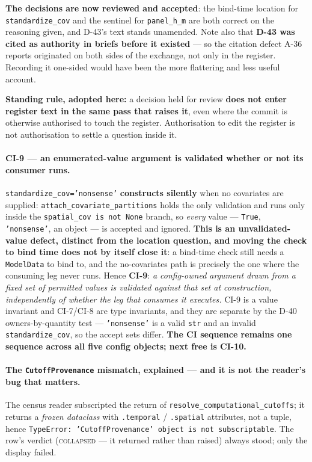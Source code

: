 \documentclass[
  10pt,
]{article}
\begin{document}
\textbf{The decisions are now reviewed and accepted}: the bind-time location for \texttt{standardize\_cov} and the sentinel for \texttt{panel\_h\_m} are both correct on the reasoning given, and D-43's text stands unamended. Note also that \textbf{D-43 was cited as authority in briefs before it existed} --- so the citation defect A-36 reports originated on both sides of the exchange, not only in the register. Recording it one-sided would have been the more flattering and less useful account.

\textbf{Standing rule, adopted here:} a decision held for review \textbf{does not enter register text in the same pass that raises it}, even where the commit is otherwise authorised to touch the register. Authorisation to edit the register is not authorisation to settle a question inside it.

\paragraph{CI-9 --- an enumerated-value argument is validated whether or not its consumer runs.}
\texttt{standardize\_cov='nonsense'} \textbf{constructs silently} when no covariates are supplied: \texttt{attach\_covariate\_partitions} holds the only validation and runs only inside the \texttt{spatial\_cov is not None} branch, so \emph{every} value --- \texttt{True}, \texttt{'nonsense'}, an object --- is accepted and ignored. \textbf{This is an unvalidated-value defect, distinct from the location question, and moving the check to bind time does not by itself close it}: a bind-time check still needs a \texttt{ModelData} to bind to, and the no-covariates path is precisely the one where the consuming leg never runs. Hence \textbf{CI-9}: \emph{a config-owned argument drawn from a fixed set of permitted values is validated against that set at construction, independently of whether the leg that consumes it executes.} CI-9 is a value invariant and CI-7/CI-8 are type invariants, and they are separate by the D-40 owners-by-quantity test --- \texttt{'nonsense'} is a valid \texttt{str} and an invalid \texttt{standardize\_cov}, so the accept sets differ. \textbf{The CI sequence remains one sequence across all five config objects; next free is CI-10.}

\paragraph{The \texttt{CutoffProvenance} mismatch, explained --- and it is not the reader's bug that matters.}
The census reader subscripted the return of \texttt{resolve\_computational\_cutoffs}; it returns a \emph{frozen dataclass} with \texttt{.temporal} / \texttt{.spatial} attributes, not a tuple, hence \texttt{TypeError: 'CutoffProvenance' object is not subscriptable}. The row's verdict (\textsc{collapsed} --- it returned rather than raised) always stood; only the display failed.
\end{document}
